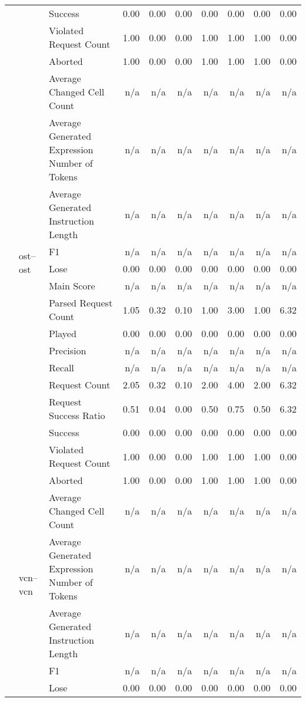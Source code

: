 \begin{tabular}{lllrrrrrrr}
 &  & Success & 0.00 & 0.00 & 0.00 & 0.00 & 0.00 & 0.00 & 0.00 \\
 &  & Violated Request Count & 1.00 & 0.00 & 0.00 & 1.00 & 1.00 & 1.00 & 0.00 \\
\cline{2-10}
 & \multirow[t]{15}{*}{ost--ost} & Aborted & 1.00 & 0.00 & 0.00 & 1.00 & 1.00 & 1.00 & 0.00 \\
 &  & Average Changed Cell Count & n/a & n/a & n/a & n/a & n/a & n/a & n/a \\
 &  & Average Generated Expression Number of Tokens & n/a & n/a & n/a & n/a & n/a & n/a & n/a \\
 &  & Average Generated Instruction Length & n/a & n/a & n/a & n/a & n/a & n/a & n/a \\
 &  & F1 & n/a & n/a & n/a & n/a & n/a & n/a & n/a \\
 &  & Lose & 0.00 & 0.00 & 0.00 & 0.00 & 0.00 & 0.00 & 0.00 \\
 &  & Main Score & n/a & n/a & n/a & n/a & n/a & n/a & n/a \\
 &  & Parsed Request Count & 1.05 & 0.32 & 0.10 & 1.00 & 3.00 & 1.00 & 6.32 \\
 &  & Played & 0.00 & 0.00 & 0.00 & 0.00 & 0.00 & 0.00 & 0.00 \\
 &  & Precision & n/a & n/a & n/a & n/a & n/a & n/a & n/a \\
 &  & Recall & n/a & n/a & n/a & n/a & n/a & n/a & n/a \\
 &  & Request Count & 2.05 & 0.32 & 0.10 & 2.00 & 4.00 & 2.00 & 6.32 \\
 &  & Request Success Ratio & 0.51 & 0.04 & 0.00 & 0.50 & 0.75 & 0.50 & 6.32 \\
 &  & Success & 0.00 & 0.00 & 0.00 & 0.00 & 0.00 & 0.00 & 0.00 \\
 &  & Violated Request Count & 1.00 & 0.00 & 0.00 & 1.00 & 1.00 & 1.00 & 0.00 \\
\cline{2-10}
 & \multirow[t]{15}{*}{vcn--vcn} & Aborted & 1.00 & 0.00 & 0.00 & 1.00 & 1.00 & 1.00 & 0.00 \\
 &  & Average Changed Cell Count & n/a & n/a & n/a & n/a & n/a & n/a & n/a \\
 &  & Average Generated Expression Number of Tokens & n/a & n/a & n/a & n/a & n/a & n/a & n/a \\
 &  & Average Generated Instruction Length & n/a & n/a & n/a & n/a & n/a & n/a & n/a \\
 &  & F1 & n/a & n/a & n/a & n/a & n/a & n/a & n/a \\
 &  & Lose & 0.00 & 0.00 & 0.00 & 0.00 & 0.00 & 0.00 & 0.00 \\

\end{tabular}
